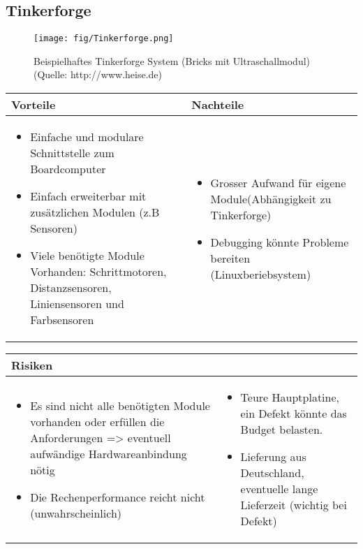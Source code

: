 \pagebreak


\subsection{Tinkerforge}
\begin{figure}[h]
	\centering
	\texttt{[image: fig/Tinkerforge.png]}
	\caption{Beispielhaftes Tinkerforge System (Bricks mit Ultraschallmodul) (Quelle: http://www.heise.de)}
\end{figure}

\begin{table}[h]
\begin{tabular}{p{} | p{}}


\textbf{Vorteile} & \textbf{Nachteile} \\ \hline
	 
\begin{itemize}
\item Einfache und modulare Schnittstelle zum Boardcomputer
\item Einfach erweiterbar mit zusätzlichen Modulen (z.B Sensoren)
\item Viele benötigte Module Vorhanden: Schrittmotoren, Distanzsensoren, Liniensensoren und Farbsensoren
\end{itemize}
 &
\begin{itemize}
\item Grosser Aufwand für eigene Module(Abhängigkeit zu Tinkerforge)
\item Debugging könnte Probleme bereiten (Linuxberiebsystem) 
\end{itemize}
\end{tabular}
\end{table}


\begin{table}[h]
\begin{tabular}{p{}p{}}


\textbf{Risiken} & \\ \hline
	 
\begin{itemize}
\item Es sind nicht alle benötigten Module vorhanden oder erfüllen die Anforderungen => eventuell aufwändige Hardwareanbindung nötig
\item Die Rechenperformance reicht nicht (unwahrscheinlich)
\end{itemize}
&
\begin{itemize}
\item Teure Hauptplatine, ein Defekt könnte das Budget belasten.
\item Lieferung aus Deutschland, eventuelle lange Lieferzeit (wichtig bei Defekt)
\end{itemize}

 
\end{tabular}
\end{table}

\pagebreak